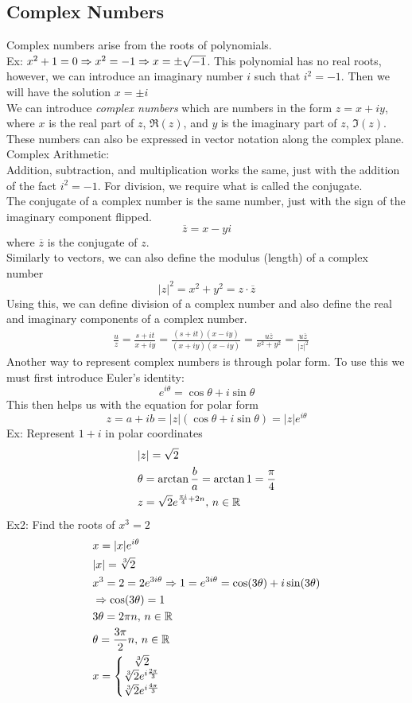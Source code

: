 \documentclass[11pt, fleqn]{article}
\begin{document}
\subsection{Complex Numbers}
Complex numbers arise from the roots of polynomials.\\
Ex: $x^2+1=0\Rightarrow x^2=-1 \Rightarrow x=\pm\sqrt{-1}$. This polynomial has no real roots, however, we can introduce an imaginary number $i$ such that $i^2=-1$. Then we will have the solution $x=\pm i$\\
We can introduce \textit{complex numbers} which are numbers in the form $z=x+iy$, where $x$ is the real part of $z$, $\Re(z)$, and $y$ is the imaginary part of $z$, $\Im(z)$. 
These numbers can also be expressed in vector notation along the complex plane.\\
Complex Arithmetic:\\
Addition, subtraction, and multiplication works the same, just with the addition of the fact $i^2=-1$. For division, we require what is called the conjugate.\\
The conjugate of a complex number is the same number, just with the sign of the imaginary component flipped.
$$\overline{z}=x-yi$$
where $\overline{z}$ is the conjugate of $z$.\\
Similarly to vectors, we can also define the modulus (length) of a complex number
$$|z|^2=x^2+y^2=z\cdot\overline{z}$$
Using this, we can define division of a complex number and also define the real and imaginary components of a complex number.
\begin{align*}
    &\frac{u}{z}=\frac{s+it}{x+iy}=\frac{(s+it)(x-iy)}{(x+iy)(x-iy)}=\frac{u\overline{z}}{x^2+y^2}=\frac{u\overline{z}}{|z|^2}
\end{align*}
Another way to represent complex numbers is through polar form. To use this we must first introduce Euler's identity:
$$e^{i\theta}=\cos\theta+i\sin\theta$$
This then helps us with the equation for polar form
$$z=a+ib=|z|(\cos\theta+i\sin\theta)=|z|e^{i\theta}$$
Ex: Represent $1+i$ in polar coordinates
\begin{align*}
    &|z|=\sqrt{2}\\
    &\theta=\arctan{\frac{b}{a}}=\arctan{1}=\frac{\pi}{4}\\
    &z=\sqrt{2}e^{\frac{\pi i}{4}+2n},\,n\in\mathbb{R}
\end{align*}
Ex2: Find the roots of $x^3=2$
\begin{align*}
    &x=|x|e^{i\theta}\\
    &|x|=\sqrt[3]{2}\\
    &x^3=2=2e^{3i\theta}\Rightarrow 1=e^{3i\theta}=\cos(3\theta)+i\sin(3\theta)\\
    &\Rightarrow \cos(3\theta)=1\\
    &3\theta=2\pi n,\,n\in\mathbb{R}\\
    &\theta=\frac{3\pi}{2}n,\,n\in\mathbb{R}\\
    &x=\left\{\begin{matrix} \sqrt[3]{2}\\\sqrt[3]{2}e^{i\frac{2\pi}{3}}\\\sqrt[3]{2}e^{i\frac{4\pi}{3}} \end{matrix}\right.
\end{align*}
\end{document}
